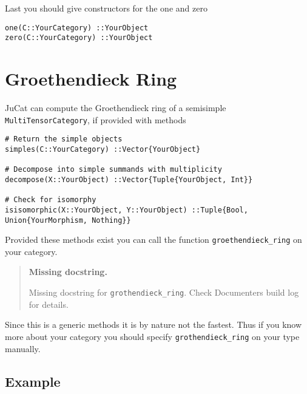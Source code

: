 \documentclass{memoir}
\begin{document}
Last you should give constructors for the one and zero




\begin{lstlisting}
one(C::YourCategory) ::YourObject
zero(C::YourCategory) ::YourObject
\end{lstlisting}



\hypertarget{4705679350657678226}{}


\chapter{Groethendieck Ring}



JuCat can compute the Groethendieck ring of a semisimple \texttt{MultiTensorCategory}, if provided with methods




\begin{lstlisting}
# Return the simple objects
simples(C::YourCategory) ::Vector{YourObject}

# Decompose into simple summands with multiplicity
decompose(X::YourObject) ::Vector{Tuple{YourObject, Int}}

# Check for isomorphy
isisomorphic(X::YourObject, Y::YourObject) ::Tuple{Bool, Union{YourMorphism, Nothing}}
\end{lstlisting}



Provided these methods exist you can call the function \texttt{groethendieck\_ring} on your category.



\begin{quote}
\textbf{Missing docstring.}

Missing docstring for \texttt{grothendieck\_ring}. Check Documenter{\textquotesingle}s build log for details.

\end{quote}


Since this is a generic methods it is by nature not the fastest. Thus if you know more about your category you should specify \texttt{grothendieck\_ring} on your type manually.



\hypertarget{3004524604150878810}{}


\section{Example}
\end{document}
